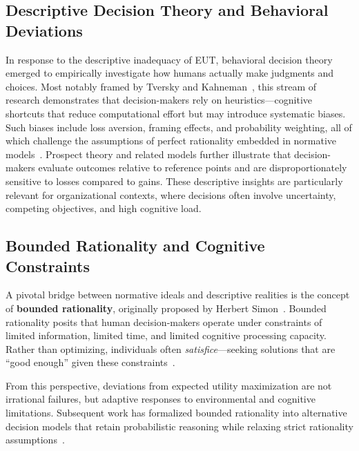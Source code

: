 \documentclass{sfuthesis}
\begin{document}
\subsection{Descriptive Decision Theory and Behavioral Deviations}
In response to the descriptive inadequacy of EUT, behavioral decision theory emerged to empirically investigate how humans actually make judgments and choices. Most notably framed by Tversky and Kahneman~\cite{tversky1978judgment}, this stream of research demonstrates that decision-makers rely on heuristics—cognitive shortcuts that reduce computational effort but may introduce systematic biases. Such biases include loss aversion, framing effects, and probability weighting, all of which challenge the assumptions of perfect rationality embedded in normative models~\cite{einhorn1981behavioral,frisch_beyond_1994}. Prospect theory and related models further illustrate that decision-makers evaluate outcomes relative to reference points and are disproportionately sensitive to losses compared to gains. These descriptive insights are particularly relevant for organizational contexts, where decisions often involve uncertainty, competing objectives, and high cognitive load.
\subsection{Bounded Rationality and Cognitive Constraints}
A pivotal bridge between normative ideals and descriptive realities is the concept of \textbf{bounded rationality}, originally proposed by Herbert Simon~\cite{simon1972theories}. Bounded rationality posits that human decision-makers operate under constraints of limited information, limited time, and limited cognitive processing capacity. Rather than optimizing, individuals often \textit{satisfice}—seeking solutions that are “good enough” given these constraints~\cite{jones_bounded_1999,gigerenzer_what_2020}.\par
From this perspective, deviations from expected utility maximization are not irrational failures, but adaptive responses to environmental and cognitive limitations. Subsequent work has formalized bounded rationality into alternative decision models that retain probabilistic reasoning while relaxing strict rationality assumptions~\cite{navarro-martinez_boundedly_2018,katsikopoulos_one-reason_2008}.
\end{document}
